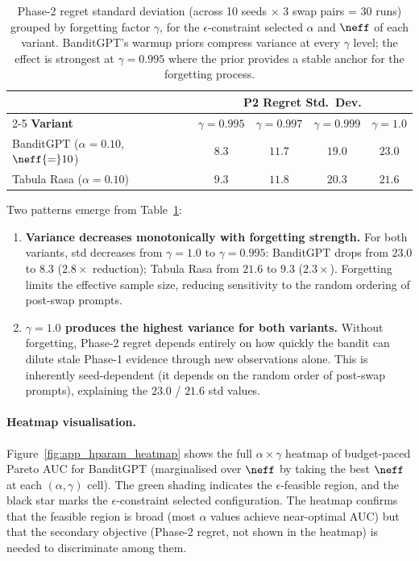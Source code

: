 \begin{table}[h]
\centering
\small
\caption{%
  Phase-2 regret standard deviation (across 10 seeds $\times$ 3 swap
  pairs = 30 runs) grouped by forgetting factor $\gamma$,
  for the $\epsilon$-constraint selected $\alpha$ and $\neff$ of
  each variant.
  BanditGPT's warmup priors compress variance at every $\gamma$ level;
  the effect is strongest at $\gamma{=}0.995$ where the prior
  provides a stable anchor for the forgetting process.%
}
\label{tab:app_per_seed_variance}
\begin{tabular}{@{}lcccc@{}}
\toprule
& \multicolumn{4}{c}{\textbf{P2 Regret Std.\ Dev.}} \\
\cmidrule(l){2-5}
\textbf{Variant}
  & $\gamma{=}0.995$ & $\gamma{=}0.997$
  & $\gamma{=}0.999$ & $\gamma{=}1.0$ \\
\midrule
BanditGPT ($\alpha{=}0.10$, $\neff{=}10$)
  & $\mathbf{8.3}$ & $11.7$ & $19.0$ & $23.0$ \\
Tabula Rasa ($\alpha{=}0.10$)
  & $\mathbf{9.3}$ & $11.8$ & $20.3$ & $21.6$ \\
\bottomrule
\end{tabular}
\end{table}

\noindent
Two patterns emerge from Table~\ref{tab:app_per_seed_variance}:
\begin{enumerate}[nosep,leftmargin=*]
  \item \textbf{Variance decreases monotonically with forgetting
    strength.}
    For both variants, std decreases from $\gamma{=}1.0$ to
    $\gamma{=}0.995$: BanditGPT drops from $23.0$ to $8.3$
    ($2.8\times$ reduction); Tabula Rasa from $21.6$ to $9.3$
    ($2.3\times$).
    Forgetting limits the effective sample size, reducing
    sensitivity to the random ordering of post-swap prompts.

  \item \textbf{$\gamma{=}1.0$ produces the highest variance for
    both variants.}
    Without forgetting, Phase-2 regret depends entirely on how
    quickly the bandit can dilute stale Phase-1 evidence through
    new observations alone.
    This is inherently seed-dependent (it depends on the random
    order of post-swap prompts), explaining the $23.0$ / $21.6$
    std values.
\end{enumerate}

\paragraph{Heatmap visualisation.}
Figure~\ref{fig:app_hparam_heatmap} shows the full
$\alpha \times \gamma$ heatmap of budget-paced Pareto AUC for
BanditGPT (marginalised over $\neff$ by taking the best $\neff$
at each $(\alpha, \gamma)$ cell).
The green shading indicates the $\epsilon$-feasible region, and
the black star marks the $\epsilon$-constraint selected
configuration.
The heatmap confirms that the feasible region is broad (most
$\alpha$ values achieve near-optimal AUC) but that the secondary
objective (Phase-2 regret, not shown in the heatmap) is needed to
discriminate among them.

